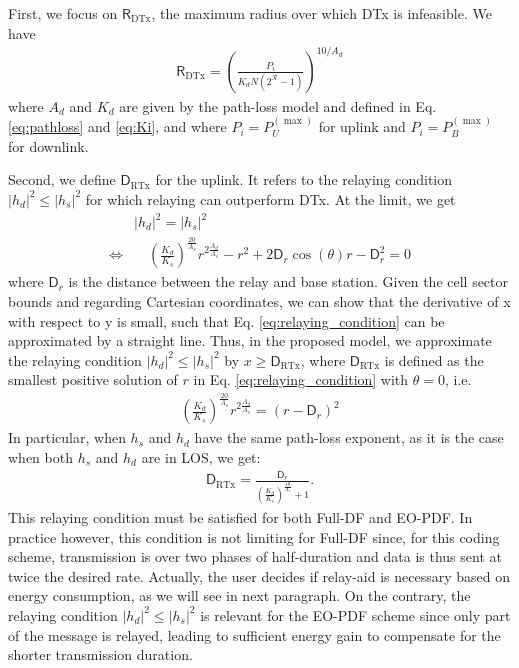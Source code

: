 \documentclass[journal]{IEEEtran}
\theoremstyle{definition}
\begin{document}
First, we focus on $\mathsf{R}_{\text{DTx}}$, the maximum radius over which DTx is infeasible. We have
\begin{align}
\mathsf{R}_{\text{DTx}} = \left(\frac{P_i}{K_d N \left(2^{\mathcal{R}}-1\right)} \right)^{10/A_d}
\end{align}
where $A_d$ and $K_d$ are given by the path-loss model and defined in Eq. \eqref{eq:pathloss} and \eqref{eq:Ki}, and where $P_i=P_U^{(\max)}$ for uplink and $P_i=P_{B}^{(\max)}$ for downlink.

Second, we define $\mathsf{D}_{\text{RTx}}$ for the uplink. It refers to the relaying condition $\vert h_d \vert^2 \leq \vert h_s \vert^2$ for which relaying can outperform DTx. At the limit, we get
\begin{align}
& \vert h_d \vert^2 = \vert h_s \vert^2 \label{eq:relaying_condition}
\\  \nonumber 
 \Leftrightarrow & \quad
\left(\frac{K_d}{K_s}\right)^{\frac{20}{A_s}} r ^{2\frac{A_d}{A_s}} - r^2 +2 \mathsf{D}_r \cos\left(\theta \right) r - \mathsf{D}_r^2 =0
\end{align}
where $\mathsf{D}_r$ is the distance between the relay and base station.
Given the cell sector bounds and regarding Cartesian coordinates, we can show that the derivative of x with respect to y is small, such that Eq. \eqref{eq:relaying_condition} can be approximated by a straight line. Thus, in the proposed model, we approximate the relaying condition $\vert h_d \vert^2 \leq \vert h_s \vert^2$ by $x \geq \mathsf{D}_{\text{RTx}}$, where
$\mathsf{D}_{\text{RTx}}$ is defined as the smallest positive solution of $r$ in Eq. \eqref{eq:relaying_condition} with $\theta = 0$, i.e.
\vspace*{-10pt}
\begin{align}
\left(\frac{K_d}{K_s}\right)^{\frac{20}{A_s}} r ^{2\frac{A_d}{A_s}} = \left(r - \mathsf{D}_r\right)^2
\end{align}
In particular, when $h_s$ and $h_d$ have the same path-loss exponent, as it is the case when both $h_s$ and $h_d$ are in LOS, we get:
\vspace*{-10pt}
\begin{align}
\mathsf{D}_{\text{RTx}} = \frac{\mathsf{D}_r}{\left(\frac{K_d}{K_s} \right)^{\frac{10}{A_s}} +1} .
\end{align}
This relaying condition must be satisfied for both Full-DF and EO-PDF. In practice however, this condition is not limiting for Full-DF since, for this coding scheme, transmission is over two phases of half-duration and data is thus sent at twice the desired rate. Actually, the user decides if relay-aid is necessary based on energy consumption, as we will see in next paragraph. On the contrary, the relaying condition $\vert h_d \vert^2 \leq \vert h_s \vert^2$ is relevant for the EO-PDF scheme since only part of the message is relayed, leading to sufficient energy gain to compensate for the shorter transmission duration.
\end{document}
